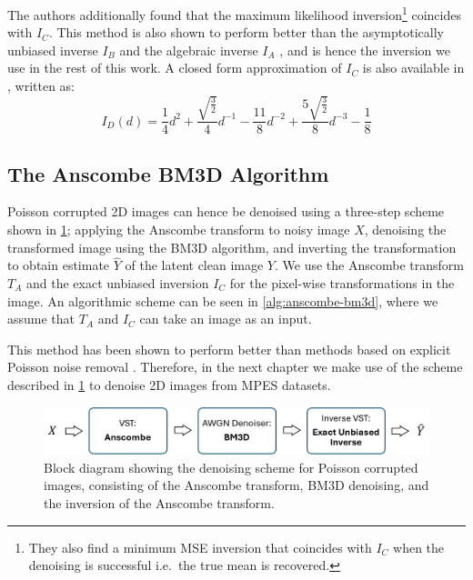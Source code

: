 The authors additionally found that the maximum likelihood inversion\footnote{They also find a minimum \gls{MSE} inversion that coincides with $I_C$ when the denoising is successful i.e.\ the true mean is recovered.} coincides with $I_C$. This method is also shown to perform better than the asymptotically unbiased inverse $I_B$ and the algebraic inverse $I_A$ \cite{makitaloOptimalInversionAnscombe2011}, and is hence the inversion we use in the rest of this work.
A closed form approximation of $I_C$ is also available in \cite{makitaloClosedFormApproximationExact2011}, written as:
\begin{equation}
    I_D(d) = \frac{1}{4} d^2 + \frac{\sqrt{\frac{3}{2}}}{4} d^{-1} - \frac{11}{8} d^{-2} + \frac{5 \sqrt{\frac{3}{2}}}{8} d^{-3} - \frac{1}{8}
\end{equation}

\subsection{The Anscombe BM3D Algorithm}
Poisson corrupted 2D images can hence be denoised using a three-step scheme shown in \cref{fig:anscombe-bm3d}; applying the Anscombe transform to noisy image $X$, denoising the transformed image using the \gls{BM3D} algorithm, and inverting the transformation to obtain estimate $\hat{Y}$ of the latent clean image $Y$. We use the Anscombe transform $T_A$ and the exact unbiased inversion $I_C$ for the pixel-wise transformations in the image. An algorithmic scheme can be seen in \cref{alg:anscombe-bm3d}, where we assume that $T_A$ and $I_C$ can take an image as an input.

This method has been shown to perform better than methods based on explicit Poisson noise removal \cite{makitaloOptimalInversionAnscombe2011}. Therefore, in the next chapter we make use of the scheme described in \cref{fig:anscombe-bm3d} to denoise 2D images from \gls{MPES} datasets.

\begin{figure} 
    \centering
    \includegraphics[width=1\linewidth]{images/bm3d_anscombe_scheme.pdf}
    \caption{Block diagram showing the denoising scheme for Poisson corrupted images, consisting of the Anscombe transform, BM3D denoising, and the inversion of the Anscombe transform.}
    \label{fig:anscombe-bm3d}
\end{figure}

